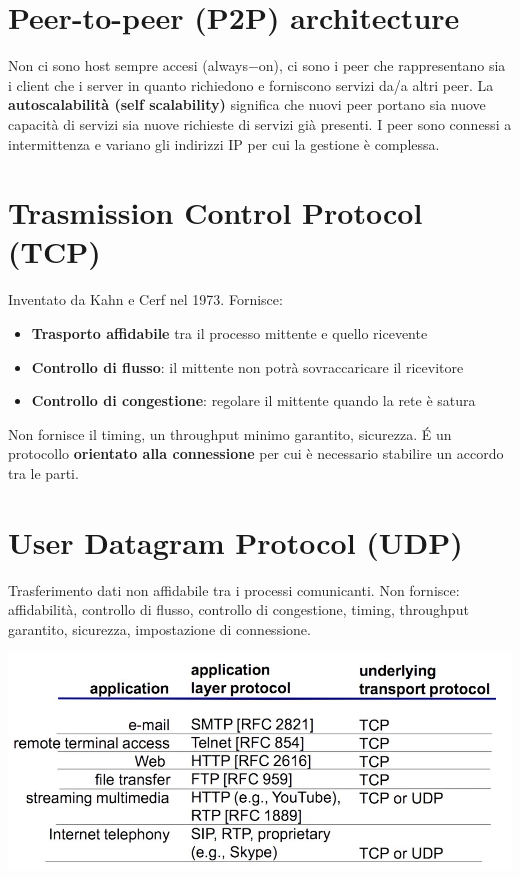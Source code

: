 \section{Peer-to-peer (P2P) architecture}
Non ci sono host sempre accesi (always$-$on), ci sono i peer che rappresentano sia i client che i server in quanto richiedono e forniscono servizi da/a altri peer. La \textbf{autoscalabilità (self scalability)} significa che nuovi peer portano sia nuove capacità di servizi sia nuove richieste di servizi già presenti.
I peer sono connessi a intermittenza e variano gli indirizzi IP per cui la gestione è complessa. 


\section{Trasmission Control Protocol (TCP)}
Inventato da Kahn e Cerf nel 1973. Fornisce:
\begin{itemize}
    \item \textbf{Trasporto affidabile} tra il processo mittente e quello ricevente
    \item \textbf{Controllo di flusso}: il mittente non potrà sovraccaricare il ricevitore
    \item \textbf{Controllo di congestione}: regolare il mittente quando la rete è satura
\end{itemize}
Non fornisce il timing, un throughput minimo garantito, sicurezza. 
\'E un protocollo \textbf{orientato alla connessione} per cui è necessario stabilire un accordo tra le parti.

\section{User Datagram Protocol (UDP)}
Trasferimento dati non affidabile tra i processi comunicanti. Non fornisce: affidabilità, controllo di flusso, controllo di congestione, timing, throughput garantito, sicurezza, impostazione di connessione. 

\begin{center}
\includegraphics[scale=0.4]{Images/TecnologieWeb/1/NetworkServicesAndTransportProtocols.jpg}    
\end{center}

